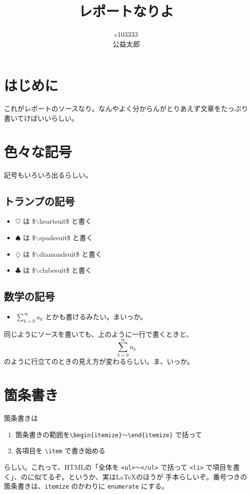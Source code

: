 \documentclass[uplatex]{jsarticle}
\title{レポートなりよ}
\author{c103333\\公益太郎}
\begin{document}
\maketitle
\section{はじめに}

これがレポートのソースなり。なんやよく分からんがとりあえず文章をたっぷり
書いてけばいいらしい。

 \section{色々な記号}
 
 記号もいろいろ出るらしい。

  \subsection{トランプの記号}

  \begin{itemize}
   \item $\heartsuit$ は \$$\backslash$heartsuit\$ と書く
   \item $\spadesuit$ は \$$\backslash$spadesuit\$ と書く
   \item $\diamondsuit$ は \$$\backslash$diamondsuit\$ と書く
   \item $\clubsuit$ は \$$\backslash$clubesuit\$ と書く
  \end{itemize}

  \subsection{数学の記号}

  \begin{itemize}
   \item $\sum_{k=0}^{\infty}a_{k}$ とかも書けるみたい。まいっか。
  \end{itemize}
  同じようにソースを書いても、上のように一行で書くときと、
  \begin{equation}
   \sum_{k=0}^{\infty}a_{k}
  \end{equation}
  のように行立てのときの見え方が変わるらしい。ま、いっか。

 \section{箇条書き}

 箇条書きは
 \begin{enumerate}
  \item 箇条書きの範囲を\verb|\begin{itemize}〜\end{itemize}| で括って
  \item 各項目を \verb|\item| で書き始める
 \end{enumerate}
 らしい。これって、HTMLの「全体を \verb|<ul>〜</ul>| で括って 
 \verb|<li>| で項目を書く」、のに似てるぞ。というか、実は\LaTeX のほうが
 手本らしいぞ。番号つきの箇条書きは、\verb|itemize| のかわりに
 \verb|enumerate| にする。
\end{document}
